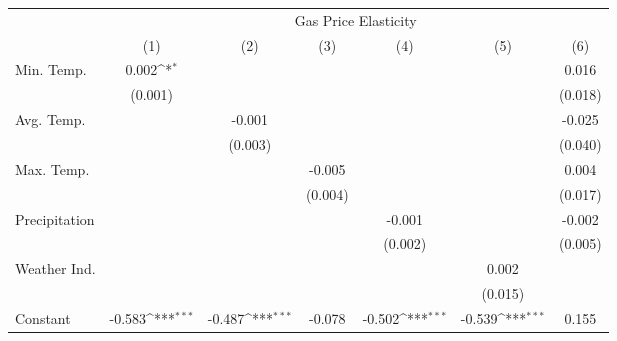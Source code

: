 {
\def\sym#1{\ifmmode^{#1}\else\(^{#1}\)\fi}
\begin{tabular}{l*{6}{c}}
\hline\hline
            &\multicolumn{6}{c}{Gas Price Elasticity}                                                                                           \\
            &\multicolumn{1}{c}{(1)}         &\multicolumn{1}{c}{(2)}         &\multicolumn{1}{c}{(3)}         &\multicolumn{1}{c}{(4)}         &\multicolumn{1}{c}{(5)}         &\multicolumn{1}{c}{(6)}         \\
\hline
Min. Temp.  &       0.002\sym{*}  &                     &                     &                     &                     &       0.016         \\
            &     (0.001)         &                     &                     &                     &                     &     (0.018)         \\
[1em]
Avg. Temp.  &                     &      -0.001         &                     &                     &                     &      -0.025         \\
            &                     &     (0.003)         &                     &                     &                     &     (0.040)         \\
[1em]
Max. Temp.  &                     &                     &      -0.005         &                     &                     &       0.004         \\
            &                     &                     &     (0.004)         &                     &                     &     (0.017)         \\
[1em]
Precipitation&                     &                     &                     &      -0.001         &                     &      -0.002         \\
            &                     &                     &                     &     (0.002)         &                     &     (0.005)         \\
[1em]
Weather Ind.&                     &                     &                     &                     &       0.002         &                     \\
            &                     &                     &                     &                     &     (0.015)         &                     \\
[1em]
Constant    &      -0.583\sym{***}&      -0.487\sym{***}&      -0.078         &      -0.502\sym{***}&      -0.539\sym{***}&       0.155         \\

\end{tabular}}
